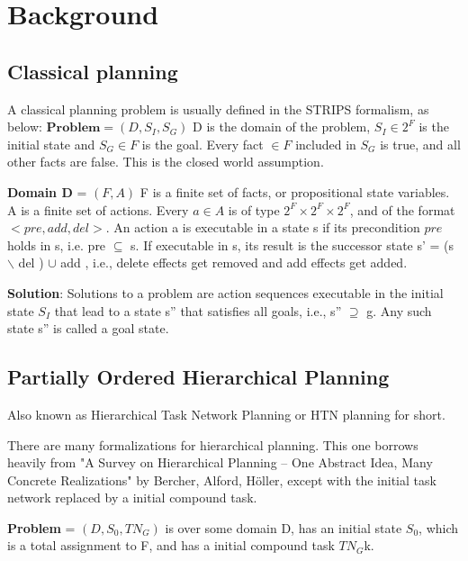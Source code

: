 \chapter{Background}\label{chap:background}

\section{Classical planning}
A classical planning problem is usually defined in the STRIPS formalism, as below:
$\textbf{Problem} = (D, S_I, S_G)$ \newline
D is the domain of the problem, \newline
$S_I \in 2^F$ is the initial state and $S_G \in F$ is the goal. \newline
Every fact $\in F$ included in $S_G$ is true, and all other facts are false. This is the closed world assumption.


\textbf{Domain D} = $(F, A)$ \newline
F is a finite set of facts, or propositional state variables. \newline
A is a finite set of actions. \newline Every $a \in A$ is of type $2^F \times 2^F \times 2^F$, and of the format $<pre, add, del>$.
An action a is executable in a state s if its precondition $pre$ holds in s, i.e. pre $\subseteq$ s. \newline
If executable in s, its result is the successor state s' = (s $\backslash$ del ) $\cup$ add , i.e., delete effects get removed and add
effects get added.

\textbf{Solution}: Solutions to a problem are action sequences executable in the initial state $S_I$ that lead to a state s'' that satisfies all
goals, i.e., s'' $ \supseteq$ g. Any such state s'' is called a goal state.

\newpage
\section{Partially Ordered Hierarchical Planning}
Also known as Hierarchical Task Network Planning or HTN planning for short.

There are many formalizations for hierarchical planning. This one borrows heavily from "A Survey on Hierarchical Planning – One Abstract Idea, Many Concrete Realizations" by Bercher, Alford, H\"{o}ller, except with the initial task network replaced by a initial compound task. 

\textbf{Problem} = $(D, S_0, TN_G)$
is over some domain D, 
has an initial state $S_0$, which is a total assignment to F, and 
has a initial compound task $TN_G$k. 

